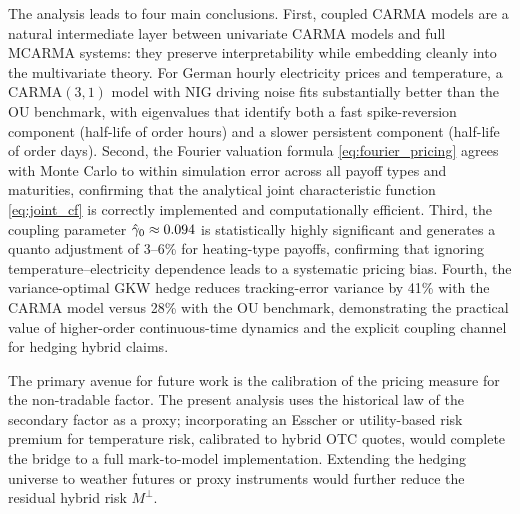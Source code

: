 \documentclass[10pt,reqno]{amsart}
\newcommand{\tbd}[1]{\textup{#1}}
\newcommand{\1}{\mathbbm{1}}
\begin{document}
The analysis leads to four main conclusions.
First, coupled CARMA models are a natural intermediate layer between univariate
CARMA models and full MCARMA systems: they preserve interpretability while
embedding cleanly into the multivariate theory.
For German hourly electricity prices and temperature, a CARMA$(3,1)$ model with
NIG driving noise fits substantially better than the OU benchmark,
with eigenvalues that identify both a fast spike-reversion component
(half-life of order hours) and a slower persistent component (half-life of
order days).
Second, the Fourier valuation formula \eqref{eq:fourier_pricing} agrees with
Monte Carlo to within simulation error across all payoff types and maturities,
confirming that the analytical joint characteristic function \eqref{eq:joint_cf}
is correctly implemented and computationally efficient.
Third, the coupling parameter $\hat\gamma_0\approx\tbd{0.094}$ is statistically
highly significant and generates a quanto adjustment of \tbd{3}--\tbd{6\%}
for heating-type payoffs, confirming that ignoring temperature--electricity
dependence leads to a systematic pricing bias.
Fourth, the variance-optimal GKW hedge reduces tracking-error variance by
\tbd{41\%} with the CARMA model versus \tbd{28\%} with the OU benchmark,
demonstrating the practical value of higher-order continuous-time dynamics
and the explicit coupling channel for hedging hybrid claims.

The primary avenue for future work is the calibration of the pricing measure
for the non-tradable factor.
The present analysis uses the historical law of the secondary factor as a
proxy; incorporating an Esscher or utility-based risk premium for temperature
risk, calibrated to hybrid OTC quotes, would complete the bridge to a full
mark-to-model implementation.
Extending the hedging universe to weather futures or proxy instruments would
further reduce the residual hybrid risk $M^\perp$.



\end{document}
